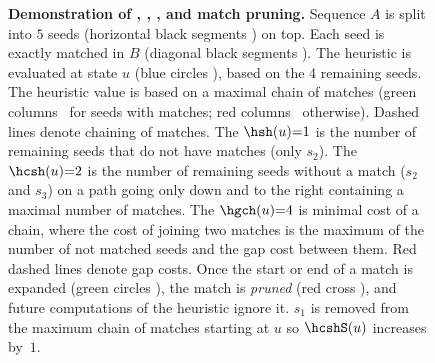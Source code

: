 \begin{figure}[H]
    \caption[Family of chaining seed heuristics]{\textbf{Demonstration of \sh, \csh, \gch, and match pruning.}
      Sequence $A$ is split into $5$ seeds (horizontal black segments \seed) on
      top. Each seed is exactly matched in $B$ (diagonal black segments \match).
      The heuristic is evaluated at state $u$ (blue circles \bluecircle), based
      on the $4$ remaining seeds. The heuristic value is based on a maximal
      chain of matches (green columns \greencolumn\ for seeds with
      matches; red columns \redcolumn\ otherwise). Dashed lines denote chaining
      of matches.
      \protect{} The \sh $\hsh(u) {=} 1$ is the number of remaining
      seeds that do not have matches (only $s_2$).
      \protect{} The \csh $\hcsh(u) {=} 2$ is the number of
      remaining seeds without a match ($s_2$ and $s_3$) on a path going only
      down and to the right containing a maximal number of matches.
      \protect{} The \gch $\hgch(u) {=} 4$ is minimal cost of a
      chain, where the cost of joining two matches is the maximum of the number
      of not matched seeds and the gap cost between them. Red dashed lines
      denote gap costs.
      \protect{} Once the start or end of a match is expanded
      (green circles \greencircle), the match is \emph{pruned} (red cross
      \cross), and future computations of the heuristic ignore it. $s_1$ is
      removed from the maximum chain of matches starting at $u$ so $\hcshS(u)$
      increases by~$1$.}
    \label{fig:heuristics}
\end{figure}

